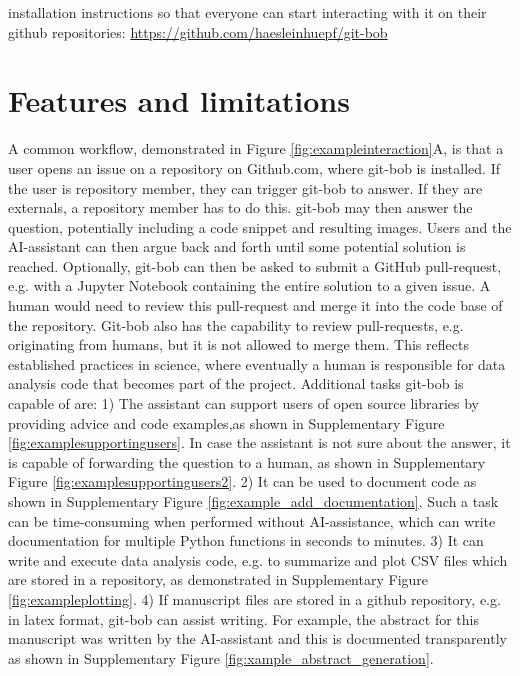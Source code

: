 \documentclass{ecai}
\begin{document}
installation instructions so that everyone can start interacting with it on their github repositories: \url{https://github.com/haesleinhuepf/git-bob}


\section{Features and limitations}

A common workflow, demonstrated in Figure \ref{fig:exampleinteraction}A, is that a user opens an issue on a repository on Github.com, where git-bob is installed. If the user is repository member, they can trigger git-bob to answer. If they are externals, a repository member has to do this. git-bob may then answer the question, potentially including a code snippet and resulting images. Users and the AI-assistant can then argue back and forth until some potential solution is reached. Optionally, git-bob can then be asked to submit a GitHub pull-request, e.g. with a Jupyter Notebook containing the entire solution to a given issue. A human would need to review this pull-request and merge it into the code base of the repository. Git-bob also has the capability to review pull-requests, e.g. originating from humans, but it is not allowed to merge them. This reflects established practices in science, where eventually a human is responsible for data analysis code that becomes part of the project. Additional tasks git-bob is capable of are: 1) The assistant can support users of open source libraries by providing advice and code examples,as shown in Supplementary Figure \ref{fig:examplesupportingusers}. In case the assistant is not sure about the answer, it is capable of forwarding the question to a human, as shown in Supplementary Figure \ref{fig:examplesupportingusers2}. 2) It can be used to document code as shown in Supplementary Figure \ref{fig:example_add_documentation}. Such a task can be time-consuming when performed without AI-assistance, which can write documentation for multiple Python functions in seconds to minutes. 3) It can write and execute data analysis code, e.g. to summarize and plot CSV files which are stored in a repository, as demonstrated in Supplementary Figure \ref{fig:exampleplotting}. 4) If manuscript files are stored in a github repository, e.g. in latex format, git-bob can assist writing. For example, the abstract for this manuscript was written by the AI-assistant and this is documented transparently as shown in Supplementary Figure \ref{fig:xample_abstract_generation}.
\end{document}
